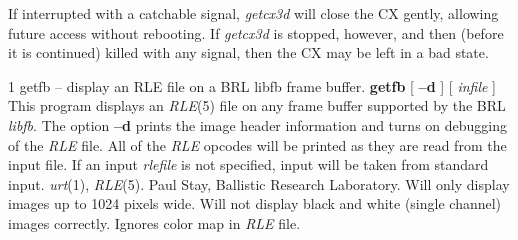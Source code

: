 If interrupted with a catchable signal,
{\it getcx3d}
will close the CX gently, allowing future access without rebooting.
If
{\it getcx3d}
is stopped, however, and then (before it is continued) killed with any
signal, then the CX may be left in a bad state.
\newpage


%
%
%
 1
getfb -- display an RLE file on a BRL libfb frame buffer.
{\bf getfb}
[
{\bf --d}
] [ 
{\it infile}
] 
This program displays an
{\it RLE}{\rm (5)}
file on any frame buffer supported by the BRL 
{\it libfb}{\rm .}
The option
{\bf --d}
prints the image header information and turns on debugging of the
{\it RLE}
file.  All of the
{\it RLE}
opcodes will be printed as they are read from the input file.
If an input
{\it rlefile}
is not specified, input will be taken from standard input.
{\it urt}{\rm (1),}
{\it RLE}{\rm (5).}
Paul Stay, Ballistic Research Laboratory.
Will only display images up to 1024 pixels wide.  Will not display
black and white (single channel) images correctly.  Ignores color map
in
{\it RLE}
file.
\newpage


